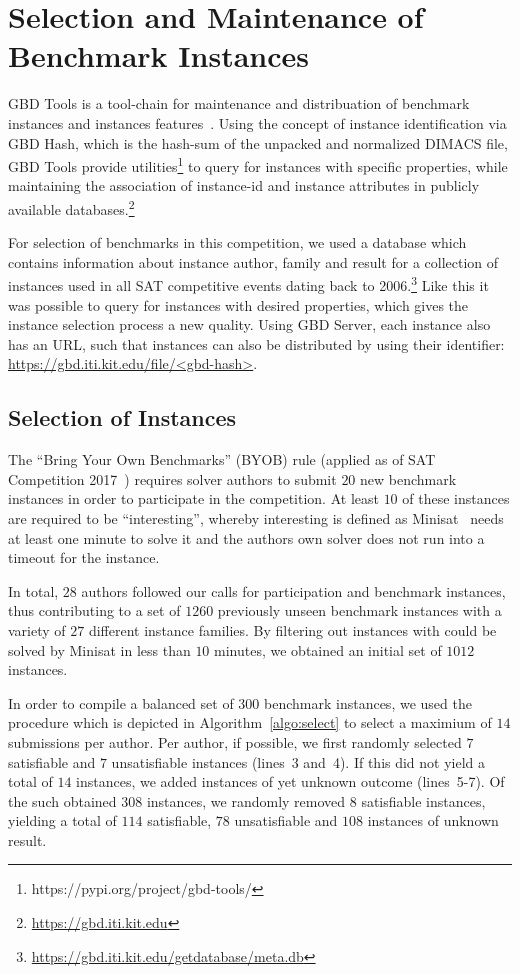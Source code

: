 \documentclass{elsarticle}
\begin{document}
\section{Selection and Maintenance of Benchmark Instances}

GBD Tools is a tool-chain for maintenance and distribuation of benchmark instances and instances features~\cite{Iser:2018:GBD}. 
Using the concept of instance identification via GBD Hash, which is the hash-sum of the unpacked and normalized DIMACS file, GBD Tools provide utilities\footnote{https://pypi.org/project/gbd-tools/} to query for instances with specific properties, while maintaining the association of instance-id and instance attributes in publicly available databases.\footnote{\url{https://gbd.iti.kit.edu}}

For selection of benchmarks in this competition, we used a database which contains information about instance author, family and result for a collection of instances used in all SAT competitive events dating back to 2006.\footnote{\url{https://gbd.iti.kit.edu/getdatabase/meta.db}} 
Like this it was possible to query for instances with desired properties, which gives the instance selection process a new quality. 
Using GBD Server, each instance also has an URL, such that instances can also be distributed by using their identifier: \url{https://gbd.iti.kit.edu/file/<gbd-hash>}.


\subsection{Selection of Instances}

The ``Bring Your Own Benchmarks'' (BYOB) rule (applied as of SAT Competition 2017~\cite{SC2017}) requires solver authors to submit $20$ new benchmark instances in order to participate in the competition. At least $10$ of these instances are required to be ``interesting'', whereby interesting is defined as Minisat~\cite{Niklas:2003:Minisat} needs at least one minute to solve it and the authors own solver does not run into a timeout for the instance. 

In total, $28$ authors followed our calls for participation and benchmark instances, thus contributing to a set of $1260$ previously unseen benchmark instances with a variety of $27$ different instance families. 
By filtering out instances with could be solved by Minisat in less than $10$ minutes, we obtained an initial set of $1012$ instances. 

In order to compile a balanced set of $300$ benchmark instances, we used the procedure which is depicted in Algorithm~\ref{algo:select} to select a maximium of $14$ submissions per author. 
Per author, if possible, we first randomly selected $7$ satisfiable and $7$ unsatisfiable instances (lines~3 and~4). 
If this did not yield a total of $14$ instances, we added instances of yet unknown outcome (lines~5-7). 
Of the such obtained $308$ instances, we randomly removed $8$ satisfiable instances, yielding a total of $114$ satisfiable, $78$ unsatisfiable and $108$ instances of unknown result. 
\end{document}
